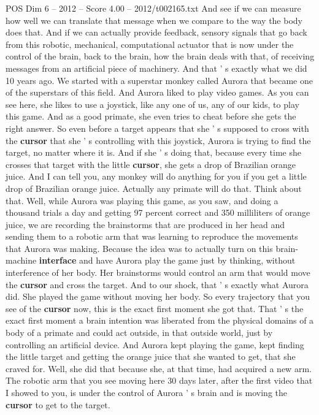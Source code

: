 \begin{textsample}{POS Dim 6 – 2012 – Score 4.00 – 2012/t002165.txt}
And see if we can measure how well we can translate that message when we compare to the way the body does that.
And if we can actually provide feedback, sensory signals that go back from this robotic, mechanical, computational actuator that is now under the control of the brain, back to the brain, how the brain deals with that, of receiving messages from an artificial piece of machinery.
And that ' s exactly what we did 10 years ago.
We started with a superstar monkey called Aurora that became one of the superstars of this field.
And Aurora liked to play video games.
As you can see here, she likes to use a joystick, like any one of us, any of our kids, to play this game.
And as a good primate, she even tries to cheat before she gets the right answer.
So even before a target appears that she ' s supposed to cross with the \textbf{cursor} that she ' s controlling with this joystick, Aurora is trying to find the target, no matter where it is.
And if she ' s doing that, because every time she crosses that target with the little \textbf{cursor}, she gets a drop of Brazilian orange juice.
And I can tell you, any monkey will do anything for you if you get a little drop of Brazilian orange juice.
Actually any primate will do that.
Think about that.
Well, while Aurora was playing this game, as you saw, and doing a thousand trials a day and getting 97 percent correct and 350 milliliters of orange juice, we are recording the brainstorms that are produced in her head and sending them to a robotic arm that was learning to reproduce the movements that Aurora was making.
Because the idea was to actually turn on this brain-machine \textbf{interface} and have Aurora play the game just by thinking, without interference of her body.
Her brainstorms would control an arm that would move the \textbf{cursor} and cross the target.
And to our shock, that ' s exactly what Aurora did.
She played the game without moving her body.
So every trajectory that you see of the \textbf{cursor} now, this is the exact first moment she got that.
That ' s the exact first moment a brain intention was liberated from the physical domains of a body of a primate and could act outside, in that outside world, just by controlling an artificial device.
And Aurora kept playing the game, kept finding the little target and getting the orange juice that she wanted to get, that she craved for.
Well, she did that because she, at that time, had acquired a new arm.
The robotic arm that you see moving here 30 days later, after the first video that I showed to you, is under the control of Aurora ' s brain and is moving the \textbf{cursor} to get to the target.

\end{textsample}

